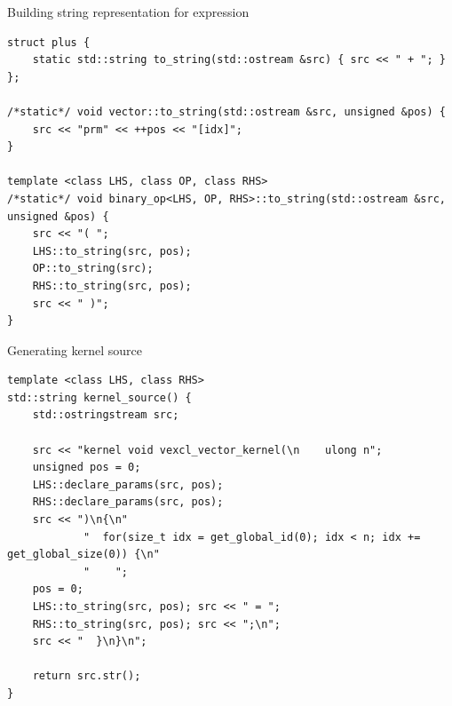 \documentclass[@BEAMER_OPTIONS@]{beamer}
\begin{document}
\note{ }

\begin{frame}[fragile]{Building string representation for expression}
    \begin{exampleblock}{}
        \begin{lstlisting}
struct plus {
    static std::string to_string(std::ostream &src) { src << " + "; }
};

/*static*/ void vector::to_string(std::ostream &src, unsigned &pos) {
    src << "prm" << ++pos << "[idx]";
}

template <class LHS, class OP, class RHS>
/*static*/ void binary_op<LHS, OP, RHS>::to_string(std::ostream &src, unsigned &pos) {
    src << "( ";
    LHS::to_string(src, pos);
    OP::to_string(src);
    RHS::to_string(src, pos);
    src << " )";
}
        \end{lstlisting}
    \end{exampleblock}
\end{frame}


\begin{frame}[fragile]{Generating kernel source}
    \begin{exampleblock}{}
        \begin{lstlisting}
template <class LHS, class RHS>
std::string kernel_source() {
    std::ostringstream src;

    src << "kernel void vexcl_vector_kernel(\n    ulong n";
    unsigned pos = 0;
    LHS::declare_params(src, pos);
    RHS::declare_params(src, pos);
    src << ")\n{\n"
            "  for(size_t idx = get_global_id(0); idx < n; idx += get_global_size(0)) {\n"
            "    ";
    pos = 0;
    LHS::to_string(src, pos); src << " = ";
    RHS::to_string(src, pos); src << ";\n";
    src << "  }\n}\n";

    return src.str();
}
        \end{lstlisting}
    \end{exampleblock}
\end{frame}

\note{ }
\end{document}
